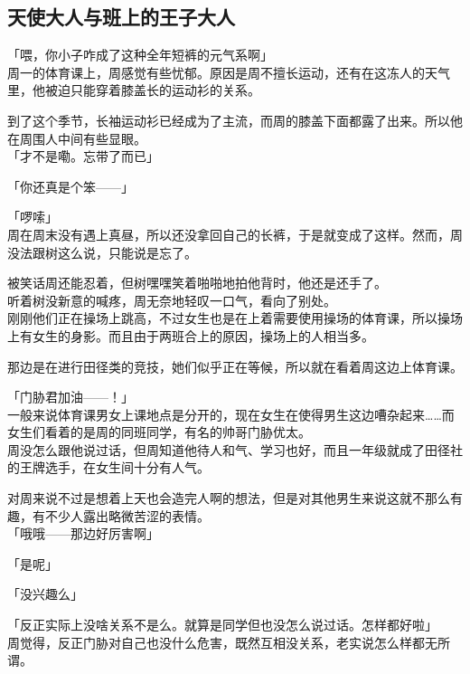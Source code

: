 \subsection{天使大人与班上的王子大人}

「喂，你小子咋成了这种全年短裤的元气系啊」\\

周一的体育课上，周感觉有些忧郁。原因是周不擅长运动，还有在这冻人的天气里，他被迫只能穿着膝盖长的运动衫的关系。

到了这个季节，长袖运动衫已经成为了主流，而周的膝盖下面都露了出来。所以他在周围人中间有些显眼。\\

「才不是嘞。忘带了而已」

「你还真是个笨——」

「啰嗦」\\

周在周末没有遇上真昼，所以还没拿回自己的长裤，于是就变成了这样。然而，周没法跟树这么说，只能说是忘了。

被笑话周还能忍着，但树嘿嘿笑着啪啪地拍他背时，他还是还手了。\\

听着树没新意的喊疼，周无奈地轻叹一口气，看向了别处。\\

刚刚他们正在操场上跳高，不过女生也是在上着需要使用操场的体育课，所以操场上有女生的身影。而且由于两班合上的原因，操场上的人相当多。

那边是在进行田径类的竞技，她们似乎正在等候，所以就在看着周这边上体育课。

「门胁君加油——！」\\

一般来说体育课男女上课地点是分开的，现在女生在使得男生这边嘈杂起来……而女生们看着的是周的同班同学，有名的帅哥门胁优太。\\

周没怎么跟他说过话，但周知道他待人和气、学习也好，而且一年级就成了田径社的王牌选手，在女生间十分有人气。

对周来说不过是想着上天也会造完人啊的想法，但是对其他男生来说这就不那么有趣，有不少人露出略微苦涩的表情。\\

「哦哦——那边好厉害啊」

「是呢」

「没兴趣么」

「反正实际上没啥关系不是么。就算是同学但也没怎么说过话。怎样都好啦」\\

周觉得，反正门胁对自己也没什么危害，既然互相没关系，老实说怎么样都无所谓。\\


